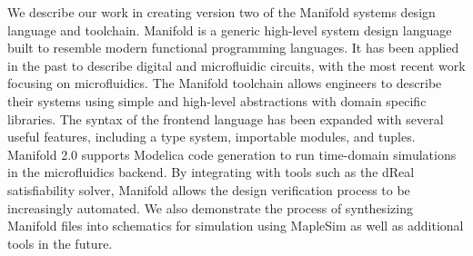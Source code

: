 We describe our work in creating version two of the Manifold systems design language and toolchain.
Manifold is a generic high-level system design language built to resemble modern functional
programming languages. It has been applied in the past to describe digital and microfluidic
circuits, with the most recent work focusing on microfluidics. The Manifold toolchain allows
engineers to describe their systems using simple and high-level abstractions with domain specific
libraries. The syntax of the frontend language has been expanded with several useful features,
including a type system, importable modules, and tuples. Manifold 2.0 supports Modelica code
generation to run time-domain simulations in the microfluidics backend. By integrating with tools
such as the dReal satisfiability solver, Manifold allows the design verification process to be
increasingly automated. We also demonstrate the process of synthesizing Manifold files into
schematics for simulation using MapleSim as well as additional tools in the future.
